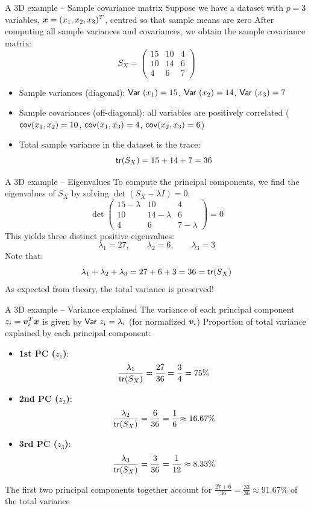 \documentclass[aspectratio=169]{beamer}\usepackage[]{graphicx}\usepackage[]{xcolor}
\begin{document}
\begin{frame}{A 3D example -- Sample covariance matrix}
Suppose we have a dataset with $p=3$ variables, $\bm{x} = (x_1, x_2, x_3)^T$, centred so that sample means are zero
\vfill
After computing all sample variances and covariances, we obtain the sample covariance matrix:
\[
S_X = \begin{pmatrix}
15 & 10 & 4 \\
10 & 14 & 6 \\
4 & 6 & 7
\end{pmatrix}
\]
\vfill
\begin{itemize}
    \item Sample variances (diagonal): $\mathsf{Var}\ (x_1) = 15$, $\mathsf{Var}\ (x_2) = 14$, $\mathsf{Var}\ (x_3) = 7$
    \item Sample covariances (off-diagonal): all variables are positively correlated ($\mathsf{cov}(x_1,x_2)=10$, $\mathsf{cov}(x_1,x_3)=4$, $\mathsf{cov}(x_2,x_3)=6$)
    \item Total sample variance in the dataset is the trace:
    \[
    \mathsf{tr}(S_X) = 15 + 14 + 7 = 36
    \]
\end{itemize}
\end{frame}


\begin{frame}{A 3D example -- Eigenvalues}
To compute the principal components, we find the eigenvalues of $S_X$ by solving $\det(S_X - \lambda I) = 0$:
\[
\det\begin{pmatrix}
15 - \lambda & 10 & 4 \\
10 & 14 - \lambda & 6 \\
4 & 6 & 7 - \lambda
\end{pmatrix} = 0
\]
\vfill
This yields three distinct positive eigenvalues:
\[
\lambda_1 = 27, \qquad \lambda_2 = 6, \qquad \lambda_3 = 3
\]
\vfill
Note that:
\[
\lambda_1 + \lambda_2 + \lambda_3 = 27 + 6 + 3 = 36 = \mathsf{tr}(S_X)
\]
As expected from theory, the total variance is preserved!
\end{frame}


\begin{frame}{A 3D example -- Variance explained}
The variance of each principal component $z_i = \bm{v}_i^T\bm{x}$ is given by $\mathsf{Var}\  z_i = \lambda_i$ (for normalized $\bm{v}_i$)
\vfill
Proportion of total variance explained by each principal component:
\begin{itemize}
    \item \textbf{1st PC ($z_1$)}: 
    \[
    \frac{\lambda_1}{\mathsf{tr}(S_X)} = \frac{27}{36} = \frac{3}{4} = 75\%
    \]
    \item \textbf{2nd PC ($z_2$)}: 
    \[
    \frac{\lambda_2}{\mathsf{tr}(S_X)} = \frac{6}{36} = \frac{1}{6} \approx 16.67\%
    \]
    \item \textbf{3rd PC ($z_3$)}: 
    \[
    \frac{\lambda_3}{\mathsf{tr}(S_X)} = \frac{3}{36} = \frac{1}{12} \approx 8.33\%
    \]
\end{itemize}
\vfill
The first two principal components together account for $\frac{27+6}{36} = \frac{33}{36} \approx 91.67\%$ of the total variance
\end{frame}
\end{document}
